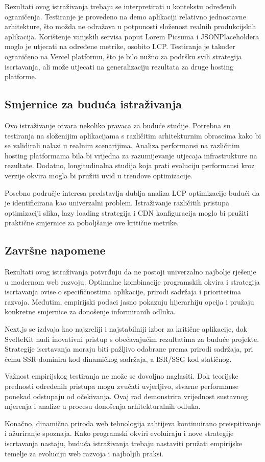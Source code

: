 Rezultati ovog istraživanja trebaju se interpretirati u kontekstu određenih ograničenja. Testiranje je provedeno na demo aplikaciji relativno jednostavne arhitekture, što možda ne odražava u potpunosti složenost realnih produkcijskih aplikacija. Korištenje vanjskih servisa poput Lorem Picsuma i JSONPlaceholdera moglo je utjecati na određene metrike, osobito LCP. Testiranje je također ograničeno na Vercel platformu, što je bilo nužno za podršku svih strategija iscrtavanja, ali može utjecati na generalizaciju rezultata za druge hosting platforme.

\subsection{Smjernice za buduća istraživanja}

Ovo istraživanje otvara nekoliko pravaca za buduće studije. Potrebna su testiranja na složenijim aplikacijama s različitim arhitekturnim obrascima kako bi se validirali nalazi u realnim scenarijima. Analiza performansi na različitim hosting platformama bila bi vrijedna za razumijevanje utjecaja infrastrukture na rezultate. Dodatno, longitudinalna studija koja prati evoluciju performansi kroz verzije okvira mogla bi pružiti uvid u trendove optimizacije.

Posebno područje interesa predstavlja dublja analiza LCP optimizacije budući da je identificirana kao univerzalni problem. Istraživanje različitih pristupa optimizaciji slika, lazy loading strategija i CDN konfiguracija moglo bi pružiti praktične smjernice za poboljšanje ove kritične metrike.

\subsection{Završne napomene}

Rezultati ovog istraživanja potvrđuju da ne postoji univerzalno najbolje rješenje u modernom web razvoju. Optimalne kombinacije programskih okvira i strategija iscrtavanja ovise o specifičnostima aplikacije, prirodi sadržaja i prioritetima razvoja. Međutim, empirijski podaci jasno pokazuju hijerarhiju opcija i pružaju konkretne smjernice za donošenje informiranih odluka.

Next.js se izdvaja kao najzreliji i najstabilniji izbor za kritične aplikacije, dok SvelteKit nudi inovativni pristup s obećavajućim rezultatima za buduće projekte. Strategije iscrtavanja moraju biti pažljivo odabrane prema prirodi sadržaja, pri čemu SSR dominira kod dinamičkog sadržaja, a ISR/SSG kod statičnog.

Važnost empirijskog testiranja ne može se dovoljno naglasiti. Dok teorijske prednosti određenih pristupa mogu zvučati uvjerljivo, stvarne performanse ponekad odstupaju od očekivanja. Ovaj rad demonstrira vrijednost sustavnog mjerenja i analize u procesu donošenja arhitekturalnih odluka.

Konačno, dinamična priroda web tehnologija zahtijeva kontinuirano preispitivanje i ažuriranje spoznaja. Kako programski okviri evoluiraju i nove strategije iscrtavanja nastaju, buduća istraživanja trebaju nastaviti pružati empirijske temelje za evoluciju web razvoja i najboljih praksi.

